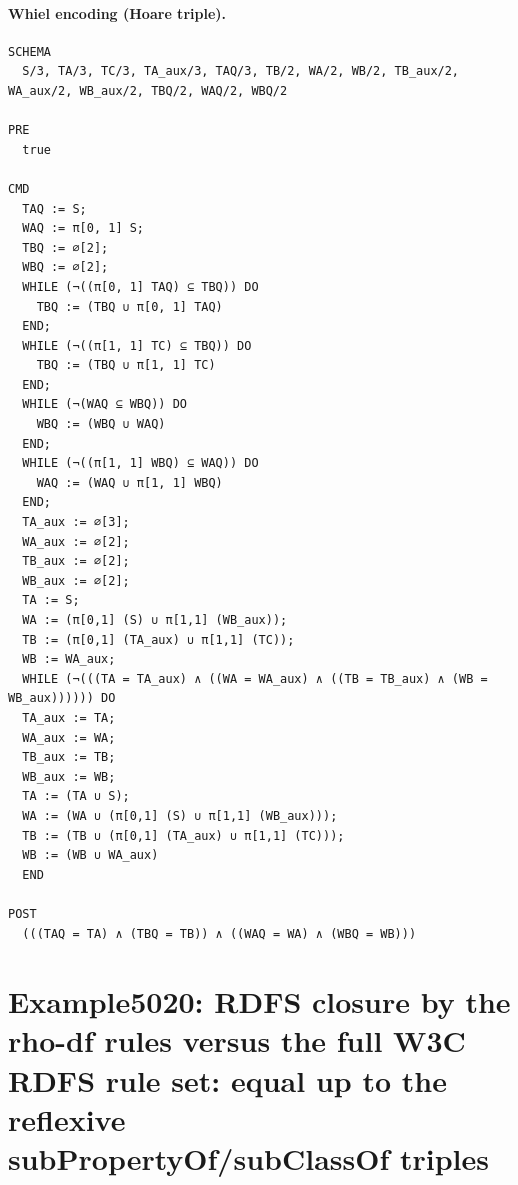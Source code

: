 \documentclass[10pt]{article}
\begin{document}
\paragraph{Whiel encoding (Hoare triple).}

\begin{Verbatim}[fontsize=\tiny,breaklines=true,breakanywhere=true,frame=single,framesep=1.5mm]
SCHEMA
  S/3, TA/3, TC/3, TA_aux/3, TAQ/3, TB/2, WA/2, WB/2, TB_aux/2, WA_aux/2, WB_aux/2, TBQ/2, WAQ/2, WBQ/2

PRE
  true 

CMD
  TAQ := S;
  WAQ := π[0, 1] S;
  TBQ := ∅[2];
  WBQ := ∅[2];
  WHILE (¬((π[0, 1] TAQ) ⊆ TBQ)) DO
    TBQ := (TBQ ∪ π[0, 1] TAQ)
  END;
  WHILE (¬((π[1, 1] TC) ⊆ TBQ)) DO
    TBQ := (TBQ ∪ π[1, 1] TC)
  END;
  WHILE (¬(WAQ ⊆ WBQ)) DO
    WBQ := (WBQ ∪ WAQ)
  END;
  WHILE (¬((π[1, 1] WBQ) ⊆ WAQ)) DO
    WAQ := (WAQ ∪ π[1, 1] WBQ)
  END;
  TA_aux := ∅[3];
  WA_aux := ∅[2];
  TB_aux := ∅[2];
  WB_aux := ∅[2];
  TA := S;
  WA := (π[0,1] (S) ∪ π[1,1] (WB_aux));
  TB := (π[0,1] (TA_aux) ∪ π[1,1] (TC));
  WB := WA_aux;
  WHILE (¬(((TA = TA_aux) ∧ ((WA = WA_aux) ∧ ((TB = TB_aux) ∧ (WB = WB_aux)))))) DO
  TA_aux := TA;
  WA_aux := WA;
  TB_aux := TB;
  WB_aux := WB;
  TA := (TA ∪ S);
  WA := (WA ∪ (π[0,1] (S) ∪ π[1,1] (WB_aux)));
  TB := (TB ∪ (π[0,1] (TA_aux) ∪ π[1,1] (TC)));
  WB := (WB ∪ WA_aux)
  END

POST
  (((TAQ = TA) ∧ (TBQ = TB)) ∧ ((WAQ = WA) ∧ (WBQ = WB)))
\end{Verbatim}

\Needspace{0.45\textheight}

\section{Example5020: RDFS closure by the rho-df rules versus the full W3C RDFS rule set: equal up to the reflexive subPropertyOf/subClassOf triples}\label{case:Example5020}
\end{document}
